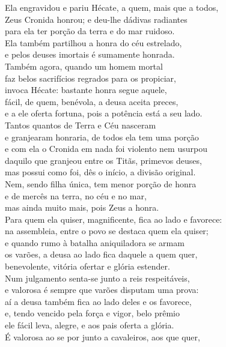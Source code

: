 \quad{}Ela engravidou e pariu Hécate, a quem, mais que a todos,\\
Zeus Cronida honrou; e deu-lhe dádivas radiantes\\
para ela ter porção da terra e do mar ruidoso.\\
Ela também partilhou a honra do céu estrelado,\\
e pelos deuses imortais é sumamente honrada. \\
Também agora, quando um homem mortal\\
faz belos sacrifícios regrados para os propiciar,\\
invoca Hécate: bastante honra segue aquele,\\
fácil, de quem, benévola, a deusa aceita preces,\\
e a ele oferta fortuna, pois a potência está a seu lado. \\
Tantos quantos de Terra e Céu nasceram\\
e granjearam honraria, de todos ela tem uma porção\\
e com ela o Cronida em nada foi violento nem usurpou\\
daquilo que granjeou entre os Titãs, primevos deuses,\\
mas possui como foi, dês o início, a divisão original. \\
Nem, sendo filha única, tem menor porção de honra\\
e de mercês na terra, no céu e no mar,\\
mas ainda muito mais, pois Zeus a honra.\\
Para quem ela quiser, magnificente, fica ao lado e favorece:\\
na assembleia, entre o povo se destaca quem ela quiser; \\
e quando rumo à batalha aniquiladora se armam\\
os varões, a deusa ao lado fica daquele a quem quer,\\
benevolente, vitória ofertar e glória estender.\\
Num julgamento senta-se junto a reis respeitáveis,\\
e valorosa é sempre que varões disputam uma prova: \\
aí a deusa também fica ao lado deles e os favorece,\\
e, tendo vencido pela força e vigor, belo prêmio\\
ele fácil leva, alegre, e aos pais oferta a glória.\\
É valorosa ao se por junto a cavaleiros, aos que quer,\\

